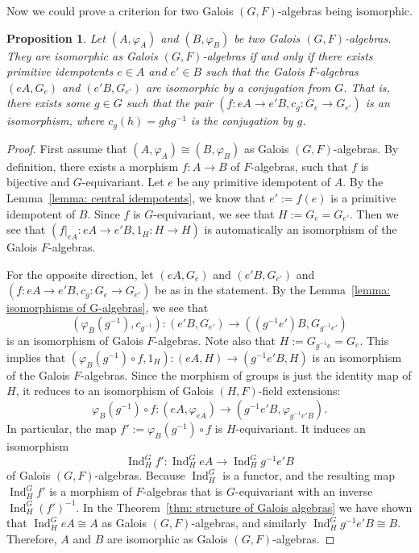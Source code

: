 \documentclass[12pt,a4paper]{amsart}
\numberwithin{equation}{section}%
\theoremstyle{plain}%
\newtheorem{proposition}[theorem]{Proposition}%
\theoremstyle{definition}%
\theoremstyle{remark}%
\begin{document}
	Now we could prove a criterion for two Galois $(G,F)$-algebras being isomorphic.
	\begin{proposition}\label{prop: isomorphisms of G-algebras}
		Let $(A,\varphi_A)$ and $(B,\varphi_B)$ be two Galois $(G,F)$-algebras.
		They are isomorphic as Galois $(G,F)$-algebras if and only if there exists primitive idempotents $e\in A$ and $e'\in B$ such that the Galois $F$-algebras $(eA,G_e)$ and $(e'B,G_{e'})$ are isomorphic by a conjugation from $G$.
		That is, there exists some $g\in G$ such that the pair $(f:eA\to e'B,c_g:G_e\to G_{e'})$ is an isomorphism, where $c_g(h)=ghg^{-1}$ is the conjugation by $g$.
	\end{proposition}
	\begin{proof}
		First assume that $(A,\varphi_A)\cong(B,\varphi_B)$ as Galois $(G,F)$-algebras.
		By definition, there exists a morphism $f:A\to B$ of $F$-algebras, such that $f$ is bijective and $G$-equivariant.
		Let $e$ be any primitive idempotent of $A$.
		By the Lemma~\ref{lemma: central idempotents}, we know that $e':=f(e)$ is a primitive idempotent of $B$.
		Since $f$ is $G$-equivariant, we see that $H:=G_e=G_{e'}$.
		Then we see that $(f\vert_{eA}:eA\to e'B,1_{H}:H\to H)$ is automatically an isomorphism of the Galois $F$-algebras.
		
		For the opposite direction, let $(eA,G_e)$ and $(e'B,G_{e'})$ and $(f:eA\to e'B,c_g:G_e\to G_{e'})$ be as in the statement.
		By the Lemma~\ref{lemma: isomorphisms of G-algebras}, we see that
		\begin{equation*}
			(\varphi_B(g^{-1}),c_{g^{-1}}):(e'B,G_{e'})\to((g^{-1}e')B,G_{g^{-1}e'})
		\end{equation*} 
		is an isomorphism of Galois $F$-algebras.
		Note also that $H:=G_{g^{-1}e}=G_e$.
		This implies that $(\varphi_B(g^{-1})\circ f,1_{H}):(eA,H)\to(g^{-1}e'B,H)$ is an isomorphism of the Galois $F$-algebras.
		Since the morphism of groups is just the identity map of $H$, it reduces to an isomorphism of Galois $(H,F)$-field extensions: 
		\begin{equation*}
			\varphi_B(g^{-1})\circ f:(eA,\varphi_{eA})\to(g^{-1}e'B,\varphi_{g^{-1}e'B}).
		\end{equation*}
		In particular, the map $f':=\varphi_B(g^{-1})\circ f$ is $H$-equivariant.
		It induces an isomorphism
		\begin{equation*}
			\operatorname{Ind}^G_H f':\operatorname{Ind}^G_H eA\to\operatorname{Ind}^G_H g^{-1}e'B
		\end{equation*}
		of Galois $(G,F)$-algebras.
		Because $\operatorname{Ind}^G_H$ is a functor, and the resulting map $\operatorname{Ind}^G_H f'$ is a morphism of $F$-algebras that is $G$-equivariant with an inverse $\operatorname{Ind}^G_H (f')^{-1}$.
		In the Theorem~\ref{thm: structure of Galois algebras} we have shown that $\operatorname{Ind}^G_H eA\cong A$ as Galois $(G,F)$-algebras, and similarly $\operatorname{Ind}^G_H g^{-1}e'B\cong B$.
		Therefore, $A$ and $B$ are isomorphic as Galois $(G,F)$-algebras.
	\end{proof}
\end{document}
